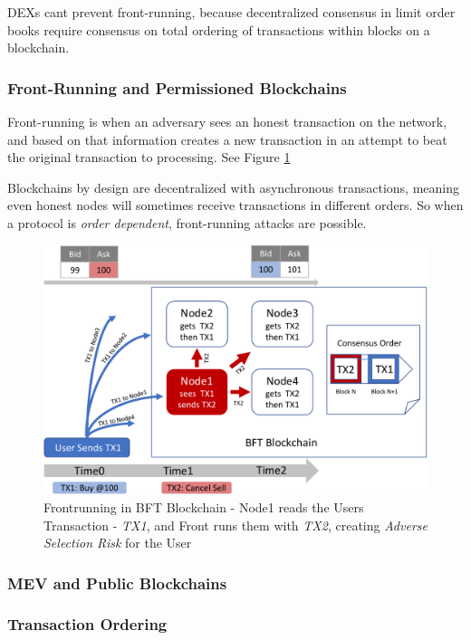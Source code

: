 \documentclass[12pt]{article}
\begin{document}
DEXs cant prevent front-running, because decentralized consensus in limit order books require consensus on total ordering of transactions within blocks on a blockchain. 


\subsubsection*{Front-Running and Permissioned Blockchains}
Front-running is when an adversary sees an honest transaction on the network, and based on that information creates a new transaction in an attempt to beat the original transaction to processing. See Figure \ref{fig:front-running}

Blockchains by design are decentralized with asynchronous transactions, meaning even honest nodes will sometimes receive transactions in different orders. So when a protocol is \emph{order dependent}, front-running attacks are possible.

\begin{figure}[ht]
  \centering \includegraphics[scale=0.4]{frontrunning3-crop.pdf}
  \caption{Frontrunning in BFT Blockchain - Node1 reads the Users Transaction - \emph{TX1}, and Front runs them with \emph{TX2}, creating \emph{Adverse Selection Risk} for the User}\label{fig:front-running}
\end{figure}


\subsubsection*{MEV and Public Blockchains}
\subsubsection*{Transaction Ordering}
\end{document}
